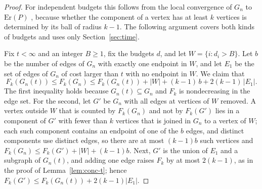 \documentclass[11pt]{amsart}
\theoremstyle{remark}
\numberwithin{equation}{section}
\newcommand{\1}{\mathbf 1}
\newcommand{\Er}{\mathrm{Er}}
\begin{document}
\begin{proof}
For independent budgets this follows from the local convergence of $G_n$ to $\Er(P)$ \cite[Theorem~2.1]{EWT}, because whether the component of a vertex has at least $k$ vertices is determined by its ball of radius $k-1$. The following argument covers both kinds of budgets and uses only Section~\ref{sec:time}.

Fix $t<\infty$ and an integer $B\ge1$, fix the budgets $d$, and let $W=\{i:d_i>B\}$. Let $b$ be the number of edges of $G_n$ with exactly one endpoint in $W$, and let $E_1$ be the set of edges of $G_n$ of cost larger than $t$ with no endpoint in $W$. We claim that
\begin{equation}\label{eq:sandwich}
F_k(G_n(t))\le F_k(G_n)\le F_k(G_n(t))+|W|+(k-1)\,b+2(k-1)\,|E_1| .
\end{equation}
The first inequality holds because $G_n(t)\subseteq G_n$ and $F_k$ is nondecreasing in the edge set. For the second, let $G'$ be $G_n$ with all edges at vertices of $W$ removed. A vertex outside $W$ that is counted by $F_k(G_n)$ and not by $F_k(G')$ lies in a component of $G'$ with fewer than $k$ vertices that is joined in $G_n$ to a vertex of $W$; each such component contains an endpoint of one of the $b$ edges, and distinct components use distinct edges, so there are at most $(k-1)b$ such vertices and $F_k(G_n)\le F_k(G')+|W|+(k-1)b$. Next, $G'$ is the union of $E_1$ and a subgraph of $G_n(t)$, and adding one edge raises $F_k$ by at most $2(k-1)$, as in the proof of Lemma~\ref{lem:conc-t}; hence $F_k(G')\le F_k(G_n(t))+2(k-1)|E_1|$.


\end{proof}
\end{document}
